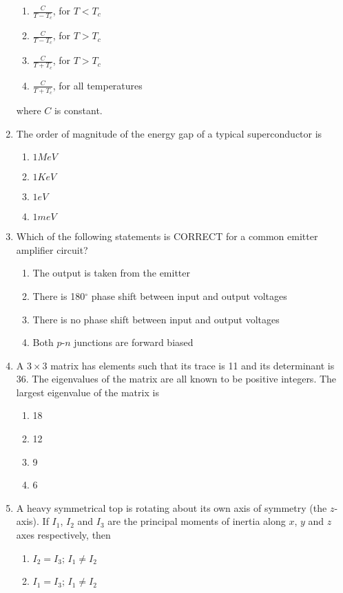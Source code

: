 \documentclass[journal]{IEEEtran}
\begin{document}
\begin{enumerate}
\begin{enumerate}
    \item $\frac{C}{T-T_c}$, for $T < T_c$
    \item $\frac{C}{T-T_c}$, for $T > T_c$
    \item $\frac{C}{T+T_c}$, for $T > T_c$
    \item $\frac{C}{T+T_c}$, for all temperatures
\end{enumerate}
where $C$ is constant.
\item The order of magnitude of the energy gap of a typical superconductor is
\begin{enumerate}
    \item $1MeV$
    \item $1KeV$
    \item $1eV$
    \item $1meV$
\end{enumerate}
\item Which of the following statements is CORRECT for a common emitter amplifier circuit?
\begin{enumerate}
    \item The output is taken from the emitter
    \item There is 180$^\circ$ phase shift between input and output voltages
    \item There is no phase shift between input and output voltages
    \item Both $p$-$n$ junctions are forward biased
\end{enumerate}
\item A $3\times3$ matrix has elements such that its trace is 11 and its determinant is 36. The eigenvalues of the matrix are all known to be positive integers. The largest eigenvalue of the matrix is
\begin{enumerate}
    \item 18
    \item 12
    \item 9
    \item 6
\end{enumerate}
\item A heavy symmetrical top is rotating about its own axis of symmetry (the $z$-axis). If $I_1$, $I_2$ and $I_3$ are the
principal moments of inertia along $x$, $y$ and $z$ axes respectively, then
\begin{enumerate}
    \item $I_2 = I_3$; $I_1 \neq I_2$
    \item $I_1 = I_3$; $I_1 \neq I_2$

\end{enumerate}
\end{enumerate}
\end{document}
